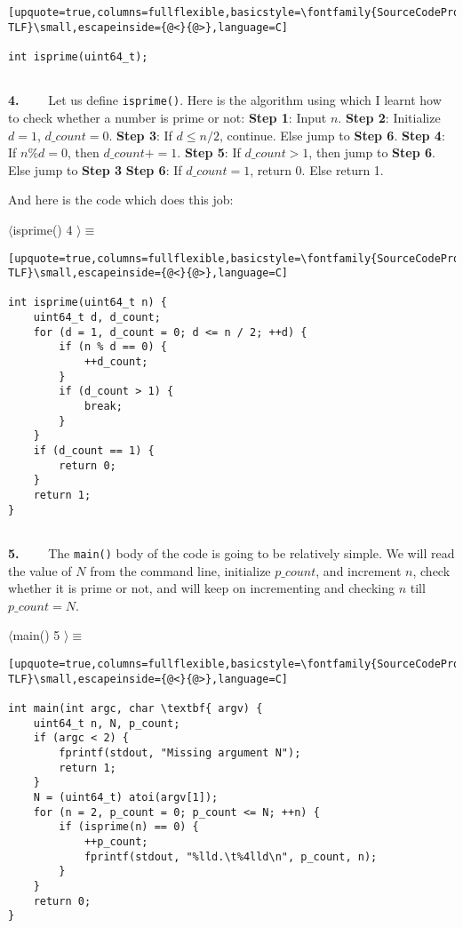 \begin{lstlisting}[upquote=true,columns=fullflexible,basicstyle=\fontfamily{SourceCodePro-TLF}\small,escapeinside={@<}{@>},language=C]

int isprime(uint64_t);


\end{lstlisting}
\textbf{4.}~~~~ Let us define \texttt{isprime()}. Here is the algorithm using which I learnt how to check whether a number
is prime or not:   
\textbf{Step 1}: Input $n$.   
\textbf{Step 2}: Initialize $d = 1$, $d\_count = 0$.   
\textbf{Step 3}: If $d \le n / 2$, continue. Else jump to \textbf{Step 6}.
\textbf{Step 4}: If $n \% d = 0$, then $d\_count += 1$.   
\textbf{Step 5}: If $d\_count > 1$, then jump to \textbf{Step 6}.  
Else jump to \textbf{Step 3}  
\textbf{Step 6}: If $d\_count = 1$, return 0. Else return 1.  

And here is the code which does this job:  
\par\noindent
$\langle$isprime() \footnotesize 4 \normalsize  $\rangle\equiv$\vspace{-10pt}

\begin{lstlisting}[upquote=true,columns=fullflexible,basicstyle=\fontfamily{SourceCodePro-TLF}\small,escapeinside={@<}{@>},language=C]

int isprime(uint64_t n) {
	uint64_t d, d_count;
	for (d = 1, d_count = 0; d <= n / 2; ++d) {
		if (n % d == 0) {
			++d_count;
		}
		if (d_count > 1) {
			break;
		}
	}
	if (d_count == 1) {
		return 0;
	}
	return 1;
}


\end{lstlisting}
\textbf{5.}~~~~ The \texttt{main()} body of the code is going to be relatively simple. We will read the value of $N$ from
the command line, initialize $p\_count$, and increment $n$, check whether it is prime or not, and will keep on
incrementing and checking $n$ till $p\_count = N$.  
\par\noindent
$\langle$main() \footnotesize 5 \normalsize  $\rangle\equiv$\vspace{-10pt}

\begin{lstlisting}[upquote=true,columns=fullflexible,basicstyle=\fontfamily{SourceCodePro-TLF}\small,escapeinside={@<}{@>},language=C]

int main(int argc, char \textbf{ argv) {
	uint64_t n, N, p_count;
	if (argc < 2) {
		fprintf(stdout, "Missing argument N");
		return 1;
	}
	N = (uint64_t) atoi(argv[1]);
	for (n = 2, p_count = 0; p_count <= N; ++n) {
		if (isprime(n) == 0) {
			++p_count;
			fprintf(stdout, "%lld.\t%4lld\n", p_count, n);
		}
	}
	return 0;
}
\end{lstlisting}
